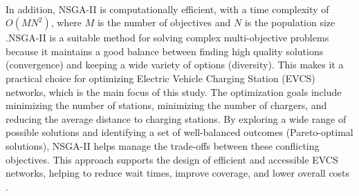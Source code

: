 \\
In addition, NSGA-II is computationally efficient, with a time complexity of \(O(MN^2)\), where \(M\) is the number of objectives and \(N\) is the population size \cite{IEEE Transactions on Evolutionary Computation}.NSGA-II is a suitable method for solving complex multi-objective problems because it maintains a good balance between finding high quality solutions (convergence) and keeping a wide variety of options (diversity). This makes it a practical choice for optimizing Electric Vehicle Charging Station (EVCS) networks, which is the main focus of this study. The optimization goals include minimizing the number of stations, minimizing the number of chargers, and reducing the average distance to charging stations. By exploring a wide range of possible solutions and identifying a set of well-balanced outcomes (Pareto-optimal solutions), NSGA-II helps manage the trade-offs between these conflicting objectives. This approach supports the design of efficient and accessible EVCS networks, helping to reduce wait times, improve coverage, and lower overall costs \cite{Multi-Objective Optimization using Evolutionary Algorithms}.

